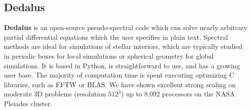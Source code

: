 {\color{purple}    
\subsection{Dedalus}}

\textbf{Dedalus} is an open-source pseudo-spectral code which can solve nearly arbitrary partial differential equations which the user specifies in plain text. Spectral methods are ideal for simulations of stellar interiors, which are typically studied in periodic boxes for local simulations or spherical geometry for global simulations. It is based in Python, is straightforward to use, and has a growing user base. The majority of computation time is spent executing optimizing C libraries, such as FFTW or BLAS. We have shown excellent strong scaling on moderate 3D problems (resolution $512^3$) up to 8,092 processors on the NASA Pleiades cluster.



